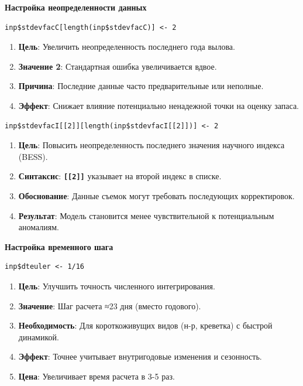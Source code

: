\documentclass[
  letterpaper,
  DIV=11,
  numbers=noendperiod]{scrreprt}
\begin{document}
\textbf{Настройка неопределенности данных}

\begin{verbatim}
inp$stdevfacC[length(inp$stdevfacC)] <- 2
\end{verbatim}

\begin{enumerate}
\def\labelenumi{\arabic{enumi}.}
\item
  \textbf{Цель}: Увеличить неопределенность последнего года вылова.
\item
  \textbf{Значение 2}: Стандартная ошибка увеличивается вдвое.
\item
  \textbf{Причина}: Последние данные часто предварительные или неполные.
\item
  \textbf{Эффект}: Снижает влияние потенциально ненадежной точки на
  оценку запаса.
\end{enumerate}

\begin{verbatim}
inp$stdevfacI[[2]][length(inp$stdevfacI[[2]])] <- 2
\end{verbatim}

\begin{enumerate}
\def\labelenumi{\arabic{enumi}.}
\item
  \textbf{Цель}: Повысить неопределенность последнего значения научного
  индекса (BESS).
\item
  \textbf{Синтаксис}: \textbf{\texttt{{[}{[}2{]}{]}}} указывает на
  второй индекс в списке.
\item
  \textbf{Обоснование}: Данные съемок могут требовать последующих
  корректировок.
\item
  \textbf{Результат}: Модель становится менее чувствительной к
  потенциальным аномалиям.
\end{enumerate}

\textbf{Настройка временного шага}

\begin{verbatim}
inp$dteuler <- 1/16
\end{verbatim}

\begin{enumerate}
\def\labelenumi{\arabic{enumi}.}
\item
  \textbf{Цель}: Улучшить точность численного интегрирования.
\item
  \textbf{Значение}: Шаг расчета ≈23 дня (вместо годового).
\item
  \textbf{Необходимость}: Для короткоживущих видов (н-р, креветка) с
  быстрой динамикой.
\item
  \textbf{Эффект}: Точнее учитывает внутригодовые изменения и
  сезонность.
\item
  \textbf{Цена}: Увеличивает время расчета в 3-5 раз.
\end{enumerate}
\end{document}
